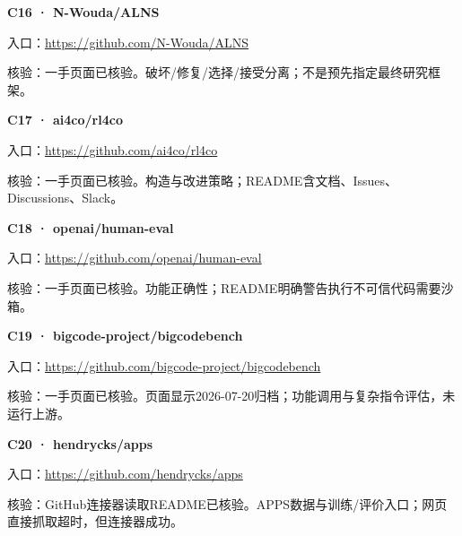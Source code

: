 \par\noindent\begin{minipage}{\linewidth}
\textbf{C16 · N-Wouda/ALNS}

入口：\url{https://github.com/N-Wouda/ALNS}

核验：一手页面已核验。破坏/修复/选择/接受分离；不是预先指定最终研究框架。
\end{minipage}\par\vspace{6pt}

\par\noindent\begin{minipage}{\linewidth}
\textbf{C17 · ai4co/rl4co}

入口：\url{https://github.com/ai4co/rl4co}

核验：一手页面已核验。构造与改进策略；README含文档、Issues、Discussions、Slack。
\end{minipage}\par\vspace{6pt}

\par\noindent\begin{minipage}{\linewidth}
\textbf{C18 · openai/human-eval}

入口：\url{https://github.com/openai/human-eval}

核验：一手页面已核验。功能正确性；README明确警告执行不可信代码需要沙箱。
\end{minipage}\par\vspace{6pt}

\par\noindent\begin{minipage}{\linewidth}
\textbf{C19 · bigcode-project/bigcodebench}

入口：\url{https://github.com/bigcode-project/bigcodebench}

核验：一手页面已核验。页面显示2026-07-20归档；功能调用与复杂指令评估，未运行上游。
\end{minipage}\par\vspace{6pt}

\par\noindent\begin{minipage}{\linewidth}
\textbf{C20 · hendrycks/apps}

入口：\url{https://github.com/hendrycks/apps}

核验：GitHub连接器读取README已核验。APPS数据与训练/评价入口；网页直接抓取超时，但连接器成功。
\end{minipage}\par\vspace{6pt}

